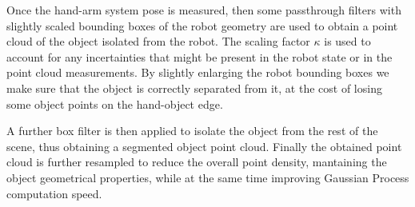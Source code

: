 Once the hand-arm  system pose is measured, then
some   passthrough filters with slightly  scaled bounding boxes of  the robot
geometry  are used  to obtain  a  point cloud  of  the object  isolated from  the
robot. The scaling factor $\kappa$ is used to account for any incertainties that might
be present in the robot state or in the point cloud measurements. 
By slightly enlarging the robot bounding boxes we make sure that the object is correctly
separated from it, at the cost of losing some object points on the hand-object edge.

A further box filter is then applied to isolate the object from the rest of the scene,
thus obtaining a segmented object point cloud. 
Finally the obtained point cloud is further resampled to reduce the overall point
density, mantaining the object geometrical properties, while at the same time
improving Gaussian Process computation speed. 

